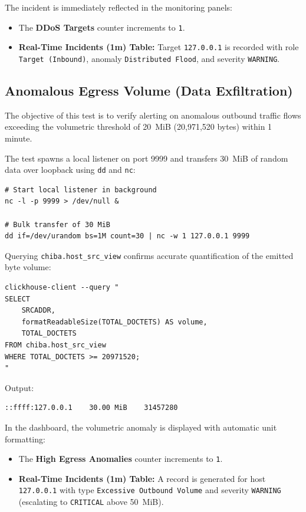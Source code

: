 \documentclass[11pt,a4paper]{article}
\newenvironment{codebox}[1][]{%
    \begin{tcolorbox}[
        colback=codebg,
        colframe=codeframe,
        boxrule=0.6pt,
        arc=1.5mm,
        left=3mm,
        right=3mm,
        top=2mm,
        bottom=2mm,
        fonttitle=\sffamily\bfseries\footnotesize,
        coltitle=chibadark,
        colbacktitle=codeframe!50!white,
        #1
    ]
}{%
    \end{tcolorbox}
}
\begin{document}
The incident is immediately reflected in the monitoring panels:
\begin{itemize}
    \item The \textbf{DDoS Targets} counter increments to \texttt{1}.
    \item \textbf{Real-Time Incidents (1m) Table:} Target \texttt{127.0.0.1} is recorded with role \texttt{Target (Inbound)}, anomaly \texttt{Distributed Flood}, and severity \texttt{WARNING}.
\end{itemize}

\subsection{Anomalous Egress Volume (Data Exfiltration)}
The objective of this test is to verify alerting on anomalous outbound traffic flows exceeding the volumetric threshold of 20~MiB (20,971,520 bytes) within 1 minute.

The test spawns a local listener on port 9999 and transfers 30~MiB of random data over loopback using \texttt{dd} and \texttt{nc}:
\begin{codebox}[title={Bulk Egress Transfer Simulation}]
\footnotesize
\begin{verbatim}
# Start local listener in background
nc -l -p 9999 > /dev/null &

# Bulk transfer of 30 MiB
dd if=/dev/urandom bs=1M count=30 | nc -w 1 127.0.0.1 9999
\end{verbatim}
\end{codebox}

Querying \texttt{chiba.host\_src\_view} confirms accurate quantification of the emitted byte volume:
\begin{codebox}[title={ClickHouse Verification Query}]
\footnotesize
\begin{verbatim}
clickhouse-client --query "
SELECT
    SRCADDR,
    formatReadableSize(TOTAL_DOCTETS) AS volume,
    TOTAL_DOCTETS
FROM chiba.host_src_view
WHERE TOTAL_DOCTETS >= 20971520;
"
\end{verbatim}
\end{codebox}

Output:
\begin{codebox}
\footnotesize
\begin{verbatim}
::ffff:127.0.0.1    30.00 MiB    31457280
\end{verbatim}
\end{codebox}

In the dashboard, the volumetric anomaly is displayed with automatic unit formatting:
\begin{itemize}
    \item The \textbf{High Egress Anomalies} counter increments to \texttt{1}.
    \item \textbf{Real-Time Incidents (1m) Table:} A record is generated for host \texttt{127.0.0.1} with type \texttt{Excessive Outbound Volume} and severity \texttt{WARNING} (escalating to \texttt{CRITICAL} above 50~MiB).
\end{itemize}
\end{document}
